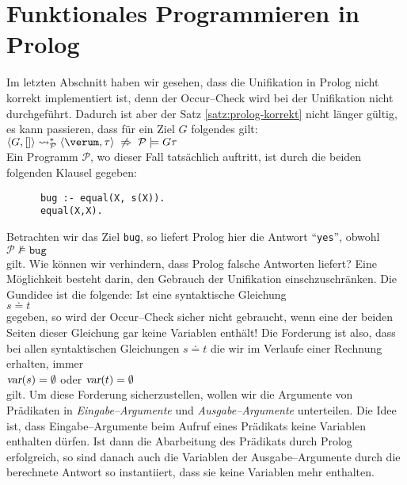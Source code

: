 \section{Funktionales Programmieren in Prolog}
Im letzten Abschnitt haben wir gesehen, dass die Unifikation in Prolog nicht korrekt implementiert ist,
denn der Occur--Check wird bei der Unifikation nicht durchgef\"{u}hrt.  Dadurch ist aber der Satz \ref{satz:prolog-korrekt}
nicht l\"{a}nger g\"{u}ltig, es kann passieren, dass f\"{u}r ein Ziel $G$ folgendes gilt: \\[0.1cm]
\hspace*{1.3cm} $\langle G, [] \rangle \leadsto_\mathcal{P}^* \langle \verum, \tau \rangle \; \not\Rightarrow \; \mathcal{P} \models G\tau$ \\[0.1cm]
Ein  Programm $\mathcal{P}$, wo dieser Fall tats\"{a}chlich auftritt, ist durch die beiden folgenden Klausel gegeben: 
\begin{verbatim}
      bug :- equal(X, s(X)).
      equal(X,X).
\end{verbatim}
Betrachten wir das Ziel \texttt{bug}, so liefert Prolog hier die Antwort ``\texttt{yes}'', obwohl \\[0.1cm]
\hspace*{1.3cm} $\mathcal{P} \not\models \mathtt{bug}$ \\[0.1cm]
gilt.  Wie k\"{o}nnen wir verhindern,  dass Prolog falsche Antworten liefert?
Eine M\"{o}glichkeit besteht darin, den Gebrauch der Unifikation einschzuschr\"{a}nken.  
Die Gundidee ist die folgende:  Ist eine syntaktische Gleichung \\[0.1cm]
\hspace*{1.3cm} $s \doteq t$ \\[0.1cm]
gegeben, so wird der Occur--Check sicher nicht gebraucht, wenn eine der beiden Seiten dieser Gleichung
gar keine Variablen enth\"{a}lt!  Die Forderung ist also, dass bei allen syntaktischen Gleichungen $s \doteq t$
die wir im Verlaufe einer Rechnung erhalten, immer \\[-0.2cm]
\hspace*{1.3cm} $\textsl{var}(s) = \emptyset$ oder $\textsl{var}(t) = \emptyset$ \\[0.1cm]
gilt.  Um diese Forderung sicherzustellen, wollen wir die Argumente von Pr\"{a}dikaten in \emph{Eingabe--Argumente} und 
\emph{Ausgabe--Argumente} unterteilen.  Die Idee ist, dass Eingabe--Argumente beim Aufruf eines Pr\"{a}dikats keine
Variablen enthalten d\"{u}rfen.  Ist dann die Abarbeitung des Pr\"{a}dikats durch Prolog erfolgreich, so sind danach auch
die Variablen der Ausgabe--Argumente durch die berechnete Antwort so instantiiert, dass sie keine Variablen
mehr enthalten.

